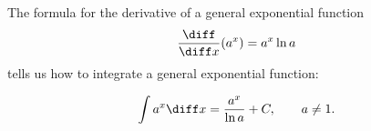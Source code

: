 \begin{frame}
The formula for the derivative of a general exponential function
\[
\frac{\diff}{\diff x} (a^x) = a^x\ln a
\]
tells us how to integrate a general exponential function:
\begin{theorem}
\[
\int a^x \diff x = \frac{a^x}{\ln a} + C, \qquad a\neq 1.
\]
\end{theorem}
\end{frame}
